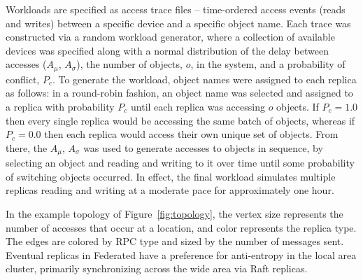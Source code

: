\documentclass[10pt,conference,letterpaper]{IEEEtran}
\begin{document}
Workloads are specified as access trace files -- time-ordered access events (reads and
writes) between a specific device and a specific object name.
Each trace was constructed via a random workload generator, where a collection of
available devices was specified along with a normal distribution of the delay between
accesses ($A_{\mu}$, $A_{\sigma}$), the number of objects, $o$, in the system, and a
probability of conflict, $P_c$.
To generate the workload, object names were assigned to each replica as follows: in a
round-robin fashion, an object name was selected and assigned to a replica with
probability $P_c$ until each replica was accessing $o$ objects.
If $P_c = 1.0$ then every single replica would be accessing the same batch of objects,
whereas if $P_c = 0.0$ then each replica would access their own unique set of objects.
From there, the $A_{\mu}$, $A_{\sigma}$ was used to generate accesses to objects in
sequence, by selecting an object and reading and writing to it over time until some
probability of switching objects occurred.
In effect, the final workload simulates multiple replicas reading and writing at a
moderate pace for approximately one hour.

In the example topology of Figure~\ref{fig:topology},
the vertex size represents the number of
accesses that occur at a location, and color represents the
replica type.
The edges are colored by RPC type and sized by the
number of messages sent.
Eventual replicas in Federated have a preference for anti-entropy in the local
area cluster, primarily synchronizing across the wide area via Raft replicas.
\end{document}
